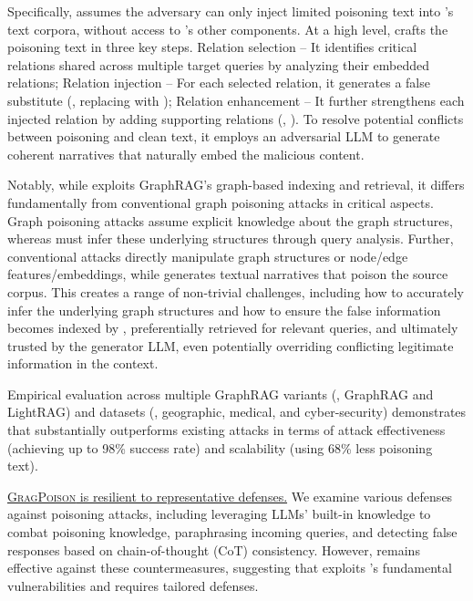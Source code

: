 Specifically, \attack assumes the adversary can only inject limited poisoning text into \rag's text corpora, without access to \rag's other components. At a high level, \attack crafts the poisoning text in three key steps. 
 Relation selection -- It identifies critical relations shared across multiple target queries by analyzing their embedded relations;
 Relation injection -- For each selected relation, it generates a false substitute (\meg, replacing  with );
 Relation enhancement -- It further strengthens each injected relation by adding supporting relations (\meg, ). To resolve potential conflicts between poisoning and clean text, it employs an adversarial LLM to generate coherent narratives that naturally embed the malicious content.

Notably, while \attack exploits GraphRAG's graph-based indexing and retrieval, it differs fundamentally from conventional graph poisoning attacks in critical aspects. Graph poisoning attacks assume explicit knowledge about the graph structures, whereas \attack must infer these underlying structures through query analysis. Further, conventional attacks directly manipulate graph structures or node/edge features/embeddings, while \attack generates textual narratives that poison the source corpus. This creates a range of non-trivial challenges, including how to accurately infer the underlying graph structures and how to ensure the false information becomes indexed by \rag, preferentially retrieved for relevant queries, and ultimately trusted by the generator LLM, even potentially overriding conflicting legitimate information in the context.

Empirical evaluation across multiple GraphRAG variants (\meg, GraphRAG and LightRAG) and datasets (\meg, geographic, medical, and cyber-security) demonstrates that \attack substantially outperforms existing attacks in terms of attack effectiveness (achieving up to 98\%  success rate) and scalability (using 68\% less poisoning text).

\vspace{2pt}
 \ul{\textsc{GragPoison} is resilient to representative defenses.}
We examine various defenses against poisoning attacks, including leveraging LLMs' built-in knowledge to combat poisoning knowledge, paraphrasing incoming queries, and detecting false responses based on chain-of-thought (CoT) consistency. However, \attack remains effective against these countermeasures, suggesting that \attack exploits \rag's fundamental vulnerabilities and requires tailored defenses.


